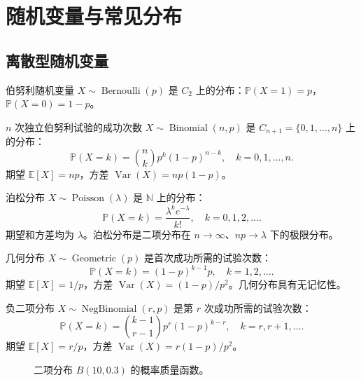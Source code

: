 \section{随机变量与常见分布}\label{sec:common_distributions}

\subsection{离散型随机变量}

\begin{definition}[伯努利分布与二项分布]\label{def:bernoulli_binomial}
伯努利随机变量 $X \sim \operatorname{Bernoulli}(p)$ 是 $C_2$ 上的分布：$\mathbb{P}(X=1) = p$，$\mathbb{P}(X=0) = 1-p$。

$n$ 次独立伯努利试验的成功次数 $X \sim \operatorname{Binomial}(n, p)$ 是 $C_{n+1} = \{0, 1, \dots, n\}$ 上的分布：
\[
\mathbb{P}(X = k) = \binom{n}{k} p^k (1-p)^{n-k}, \quad k = 0, 1, \dots, n.
\]
期望 $\mathbb{E}[X] = np$，方差 $\operatorname{Var}(X) = np(1-p)$。
\end{definition}

\begin{definition}[泊松分布]\label{def:poisson_distribution}
泊松分布 $X \sim \operatorname{Poisson}(\lambda)$ 是 $\mathbb{N}$ 上的分布：
\[
\mathbb{P}(X = k) = \frac{\lambda^k e^{-\lambda}}{k!}, \quad k = 0, 1, 2, \dots.
\]
期望和方差均为 $\lambda$。泊松分布是二项分布在 $n \to \infty$、$np \to \lambda$ 下的极限分布。
\end{definition}

\begin{definition}[几何分布与负二项分布]\label{def:geometric_negbinomial}
几何分布 $X \sim \operatorname{Geometric}(p)$ 是首次成功所需的试验次数：
\[
\mathbb{P}(X = k) = (1-p)^{k-1} p, \quad k = 1, 2, \dots.
\]
期望 $\mathbb{E}[X] = 1/p$，方差 $\operatorname{Var}(X) = (1-p)/p^2$。几何分布具有无记忆性。

负二项分布 $X \sim \operatorname{NegBinomial}(r, p)$ 是第 $r$ 次成功所需的试验次数：
\[
\mathbb{P}(X = k) = \binom{k-1}{r-1} p^r (1-p)^{k-r}, \quad k = r, r+1, \dots.
\]
期望 $\mathbb{E}[X] = r/p$，方差 $\operatorname{Var}(X) = r(1-p)/p^2$。
\end{definition}

\begin{figure}[htbp]
\centering
{}
\caption{二项分布 $B(10,0.3)$ 的概率质量函数。}
\label{fig:binomial_pmf}
\end{figure}

